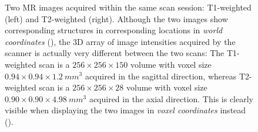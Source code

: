 \documentclass[10pt,twoside]{book}
\begin{document}
\begin{figure}
{  %
  Two MR images acquired within the same scan session: T1-weighted (left) and T2-weighted (right).
  Although the two images show corresponding structures in corresponding locations in \emph{world coordinates} (), the 3D array of image intensities acquired by the scanner is actually very different between the two scans: The T1-weighted scan is a $256 \times 256 \times 150$ volume with voxel size $0.94 \times 0.94 \times 1.2\ mm^3$ acquired in the sagittal direction, whereas T2-weighted scan is a $256 \times 256 \times 28$ volume with voxel size $0.90 \times 0.90 \times 4.98\ mm^3$ acquired in the axial direction.
  This is clearly visible when displaying the two images in \emph{voxel coordinates} instead ().
  }
  \label{fig:voxelVsWorldCoordinates}
\end{figure}
\end{document}
